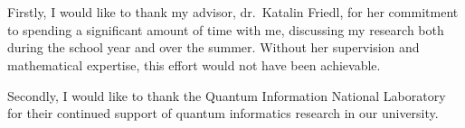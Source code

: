 \chapter*{\koszonetnyilvanitas}

Firstly, I would like to thank my advisor, dr.~Katalin Friedl, for her commitment to spending a significant amount of time with me, discussing my research both during the school year and over the summer. Without her supervision and mathematical expertise, this effort would not have been achievable.

Secondly, I would like to thank the Quantum Information National Laboratory for their continued support of quantum informatics research in our university.